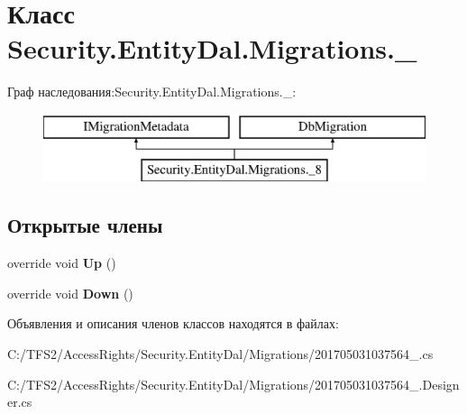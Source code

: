 \hypertarget{class_security_1_1_entity_dal_1_1_migrations_1_1__8}{}\section{Класс Security.\+Entity\+Dal.\+Migrations.\+\_}
\label{class_security_1_1_entity_dal_1_1_migrations_1_1__8}
Граф наследования\+:Security.\+Entity\+Dal.\+Migrations.\+\_\+:\begin{figure}[H]
\begin{center}
\leavevmode
\includegraphics[height=2.000000cm]{d8/dea/class_security_1_1_entity_dal_1_1_migrations_1_1__8}
\end{center}
\end{figure}
\subsection*{Открытые члены}
\begin{DoxyCompactItemize}
\item 
\mbox{\label{class_security_1_1_entity_dal_1_1_migrations_1_1__8_aa247d3f7f5c8186a73019e5045aefb5f}} 
override void {\bfseries Up} ()
\item 
\mbox{\label{class_security_1_1_entity_dal_1_1_migrations_1_1__8_a9aaed2932d4d94f2e7274149f0bd7e1b}} 
override void {\bfseries Down} ()
\end{DoxyCompactItemize}


Объявления и описания членов классов находятся в файлах\+:\begin{DoxyCompactItemize}
\item 
C\+:/\+T\+F\+S2/\+Access\+Rights/\+Security.\+Entity\+Dal/\+Migrations/201705031037564\+\_.\+cs\item 
C\+:/\+T\+F\+S2/\+Access\+Rights/\+Security.\+Entity\+Dal/\+Migrations/201705031037564\+\_.\+Designer.\+cs\end{DoxyCompactItemize}

